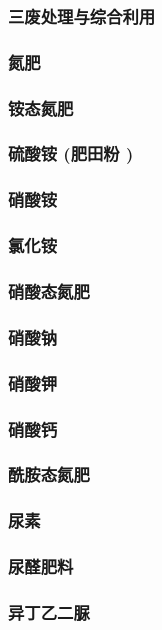 \documentclass[UTF8]{../../ApplicationUniverse}
\begin{document}
    \subsubsection{三废处理与综合利用}
\subsubsection{氮肥}
    \subsubsection{铵态氮肥}
        \subsubsection{硫酸铵 (肥田粉 )}
        \subsubsection{硝酸铵}
        \subsubsection{氯化铵}
    \subsubsection{硝酸态氮肥}
        \subsubsection{硝酸钠}
        \subsubsection{硝酸钾}
        \subsubsection{硝酸钙}
    \subsubsection{酰胺态氮肥}
        \subsubsection{尿素}
        \subsubsection{尿醛肥料}
        \subsubsection{异丁乙二脲}
\end{document}
